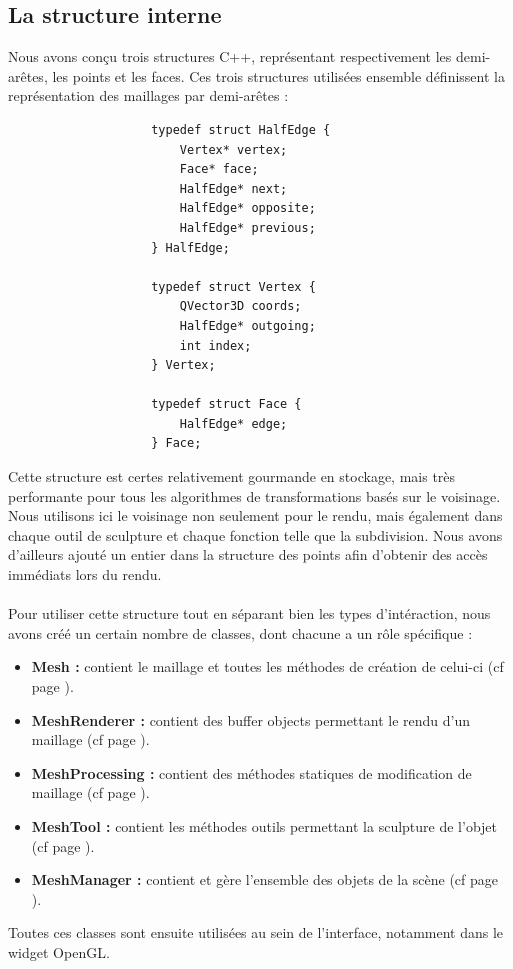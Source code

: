 \documentclass[a4paper]{memoir}
\begin{document}
			\subsection{La structure interne}
				Nous avons conçu trois structures C++, représentant respectivement les demi-arêtes, les points et les faces. Ces trois structures utilisées 
				ensemble définissent la représentation des maillages par demi-arêtes :
				\begin{verbatim}
					typedef struct HalfEdge {
					    Vertex* vertex;
					    Face* face;
					    HalfEdge* next;
					    HalfEdge* opposite;
					    HalfEdge* previous;
					} HalfEdge;

					typedef struct Vertex {
					    QVector3D coords;
					    HalfEdge* outgoing;
					    int index;
					} Vertex;

					typedef struct Face {
					    HalfEdge* edge;
					} Face;
				\end{verbatim}
				Cette structure est certes relativement gourmande en stockage, mais très performante pour tous les algorithmes de transformations basés sur 
				le voisinage. Nous utilisons ici le voisinage non seulement pour le rendu, mais également dans chaque outil de sculpture et chaque fonction 
				telle que la subdivision. Nous avons d'ailleurs ajouté un entier dans la structure des points afin d'obtenir des accès immédiats lors du 
				rendu.\\
				\\
				Pour utiliser cette structure tout en séparant bien les types d'intéraction, nous avons créé un certain nombre de classes, dont chacune a un 
				rôle spécifique :
				\begin{itemize}
					\item \textbf{Mesh :} contient le maillage et toutes les méthodes de création de celui-ci (cf page \pageref{mesh-dev}).
					\item \textbf{MeshRenderer :} contient des buffer objects permettant le rendu d'un maillage (cf page \pageref{renderer-dev}).
					\item \textbf{MeshProcessing :} contient des méthodes statiques de modification de maillage (cf page \pageref{processing-dev}).
					\item \textbf{MeshTool :} contient les méthodes outils permettant la sculpture de l'objet (cf page \pageref{tool-dev}).
					\item \textbf{MeshManager :} contient et gère l'ensemble des objets de la scène (cf page \pageref{manager-dev}).
				\end{itemize}
				Toutes ces classes sont ensuite utilisées au sein de l'interface, notamment dans le widget OpenGL.
				
\end{document}
